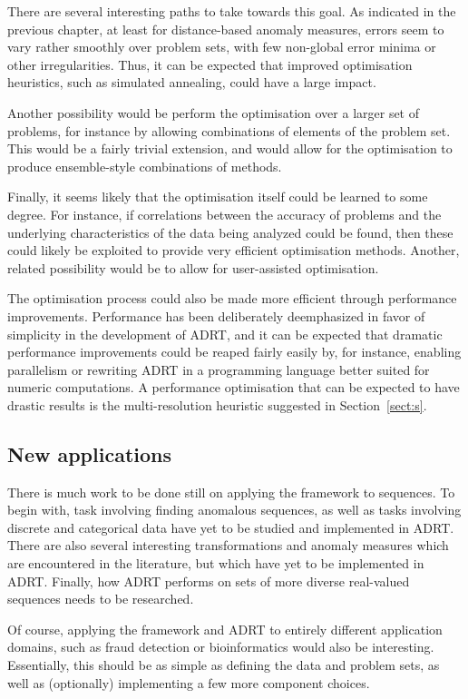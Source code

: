 There are several interesting paths to take towards this goal. As indicated in the previous chapter, at least for distance-based anomaly measures, errors seem to vary rather smoothly over problem sets, with few non-global error minima or other irregularities. Thus, it can be expected that improved optimisation heuristics, such as simulated annealing, could have a large impact.

Another possibility would be perform the optimisation over a larger set of problems, for instance by allowing combinations of elements of the problem set. This would be a fairly trivial extension, and would allow for the optimisation to produce ensemble-style combinations of methods.

Finally, it seems likely that the optimisation itself could be learned to some degree. For instance, if correlations between the accuracy of problems and the underlying characteristics of the data being analyzed could be found, then these could likely be exploited to provide very efficient optimisation methods. Another, related possibility would be to allow for user-assisted optimisation.

The optimisation process could also be made more efficient through performance improvements. Performance has been deliberately deemphasized in favor of simplicity in the development of ADRT, and it can be expected that dramatic performance improvements could be reaped fairly easily by, for instance, enabling parallelism or rewriting ADRT in a programming language better suited for numeric computations. A performance optimisation that can be expected to have drastic results is the multi-resolution heuristic suggested in Section~\ref{sect:s}.

\subsection{New applications}
There is much work to be done still on applying the framework to sequences. To begin with, task involving finding anomalous sequences, as well as tasks involving discrete and categorical data have yet to be studied and implemented in ADRT. There are also several interesting transformations and anomaly measures which are encountered in the literature, but which have yet to be implemented in ADRT. Finally, how ADRT performs on sets of more diverse real-valued sequences needs to be researched.

Of course, applying the framework and ADRT to entirely different application domains, such as fraud detection or bioinformatics would also be interesting. Essentially, this should be as simple as defining the data and problem sets, as well as (optionally) implementing a few more component choices.

